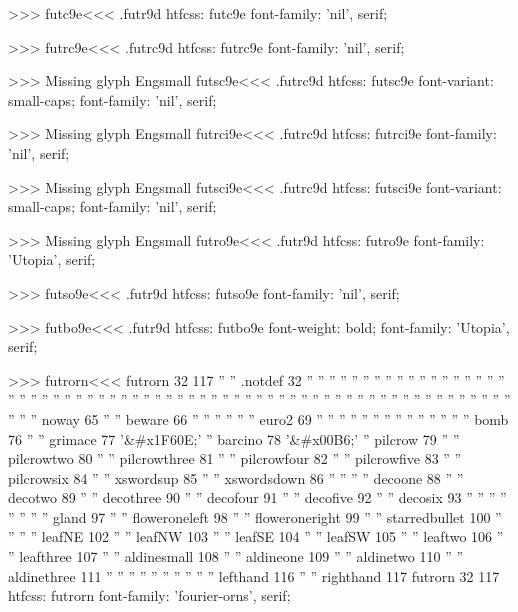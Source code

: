 {>>>
\<futc9e\><<<
.futr9d
htfcss:  futc9e  font-family: 'nil', serif;

>>>
\<futrc9e\><<<
.futrc9d
htfcss:  futrc9e  font-family: 'nil', serif;

>>>
Missing glyph	Engsmall
\<futsc9e\><<<
.futrc9d
htfcss:  futsc9e  font-variant: small-caps; font-family: 'nil', serif;

>>>
Missing glyph	Engsmall
\<futrci9e\><<<
.futrc9d
htfcss:  futrci9e  font-family: 'nil', serif;

>>>
Missing glyph	Engsmall
\<futsci9e\><<<
.futrc9d
htfcss:  futsci9e  font-variant: small-caps; font-family: 'nil', serif;

>>>
Missing glyph	Engsmall
\<futro9e\><<<
.futr9d
htfcss:  futro9e  font-family: 'Utopia', serif;

>>>
\<futso9e\><<<
.futr9d
htfcss:  futso9e  font-family: 'nil', serif;

>>>
\<futbo9e\><<<
.futr9d
htfcss:  futbo9e  font-weight: bold; font-family: 'Utopia', serif;

>>>
\<futrorn\><<<
futrorn 32 117
'' '' .notdef 32
'' ''  
'' ''  
'' ''  
'' ''  
'' ''  
'' ''  
'' ''  
'' ''  
'' ''  
'' ''  
'' ''  
'' ''  
'' ''  
'' ''  
'' ''  
'' ''  
'' ''  
'' ''  
'' ''  
'' ''  
'' ''  
'' ''  
'' ''  
'' ''  
'' ''  
'' ''  
'' ''  
'' ''  
'' ''  
'' ''  
'' ''  
'' ''  
'' '' noway 65
'' '' beware 66
'' ''  
'' ''  
'' '' euro2 69
'' ''  
'' ''  
'' ''  
'' ''  
'' ''  
'' ''  
'' '' bomb 76
'' '' grimace 77
'&#x1F60E;' '' barcino 78
'&#x00B6;' '' pilcrow 79
'' '' pilcrowtwo 80
'' '' pilcrowthree 81
'' '' pilcrowfour 82
'' '' pilcrowfive 83
'' '' pilcrowsix 84
'' '' xswordsup 85
'' '' xswordsdown 86
'' ''  
'' '' decoone 88
'' '' decotwo 89
'' '' decothree 90
'' '' decofour 91
'' '' decofive 92
'' '' decosix 93
'' ''  
'' ''  
'' ''  
'' '' gland 97
'' '' floweroneleft 98
'' '' floweroneright 99
'' '' starredbullet 100
'' ''  
'' '' leafNE 102
'' '' leafNW 103
'' '' leafSE 104
'' '' leafSW 105
'' '' leaftwo 106
'' '' leafthree 107
'' '' aldinesmall 108
'' '' aldineone 109
'' '' aldinetwo 110
'' '' aldinethree 111
'' ''  
'' ''  
'' ''  
'' ''  
'' '' lefthand 116
'' '' righthand 117
futrorn 32 117
htfcss:  futrorn  font-family: 'fourier-orns', serif;

}
